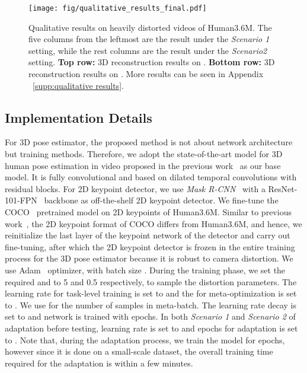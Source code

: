     \begin{figure*}[t]
        \begin{center}
            \texttt{[image: fig/qualitative\_results\_final.pdf]}
        \end{center}
        \vspace{-3mm}
        \caption{Qualitative results on heavily distorted videos of Human3.6M. The five columns from the leftmost are the result under the \small\textit{Scenario 1} \normalsize setting, while the rest columns are the result under the \small\textit{Scenario2} \normalsize setting. \textbf{Top row:} 3D reconstruction results on . \textbf{Bottom row:} 3D reconstruction results on . More results can be seen in Appendix ~\ref{supp:qualitative results}.}
        \vspace{-1mm}
        \label{fig:qualitative}
        \vspace{-3mm}
    \end{figure*}

    \subsection{Implementation Details}
        \label{sec:implementation details}
        \vspace{-1mm}
        For 3D pose estimator, the proposed method is not about network architecture but training methods. Therefore, we adopt the state-of-the-art model for 3D human pose estimation in video proposed in the previous work~\cite{ref9_pavllo20193d} as our base model. It is fully convolutional and based on dilated temporal convolutions with residual blocks. For 2D keypoint detector, we use \textit{Mask R-CNN}~\cite{ref14_He_2017_ICCV} with a ResNet-101-FPN~\cite{ref35_FPN} backbone as off-the-shelf 2D keypoint detector. We fine-tune the COCO~\cite{ref34_mscoco} pretrained model on 2D keypoints of Human3.6M. Similar to previous work~\cite{ref9_pavllo20193d}, the 2D keypoint format of COCO differs from Human3.6M, and hence, we reinitialize the last layer of the keypoint network of the detector and carry out fine-tuning, after which the 2D keypoint detector is frozen in the entire training process for the 3D pose estimator because it is robust to camera distortion. We use Adam~\cite{ref36_Adam} optimizer, with batch size . During the training phase, we set the required  and  to 5 and 0.5 respectively, to sample the distortion parameters. The learning rate  for task-level training is set to  and the  for meta-optimization is set to . We use  for the number of samples in meta-batch. The learning rate decay is set to  and network is trained with  epochs. In both \textit{Scenario 1} and \textit{Scenario 2} of adaptation before testing, learning rate is set to  and epochs for adaptation is set to . Note that, during the adaptation process, we train the model for  epochs, however since it is done on a small-scale dataset, the overall training time required for the adaptation is within a few minutes.
    
